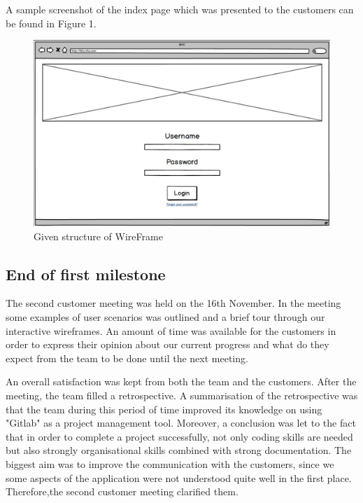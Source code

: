 \documentclass{l3proj}
\begin{document}
A sample screenshot of the index page which was presented to the customers can be found in Figure 1.

\begin{figure}
 \centerline{\includegraphics[width=\textwidth, height=\textheight, keepaspectratio]{wireframe.png}}
 \caption{Given structure of WireFrame}
 \label{fig:initialWireframe}
\end{figure}



\subsection{End of first milestone}
\label{sec:milestone1}

The second customer meeting was held on the 16th November. In the meeting some examples of user scenarios was outlined and a brief tour through our interactive wireframes. An amount of time was available for the customers in order to express their opinion about our current progress and what do they expect from the team to be done until the next meeting.

An overall satisfaction was kept from both the team and the customers. After the meeting, the team filled a retrospective. A summarisation of the retrospective was that the team during this period of time improved its knowledge on using "Gitlab" as a project management tool. Moreover, a conclusion was let to the fact that in order to complete a project successfully, not only coding skills are needed but also strongly organisational skills combined with strong documentation. The biggest aim was to improve the communication with the customers, since we some aspects of the application were not understood quite well in the first place. Therefore,the second customer meeting clarified them.
\end{document}
